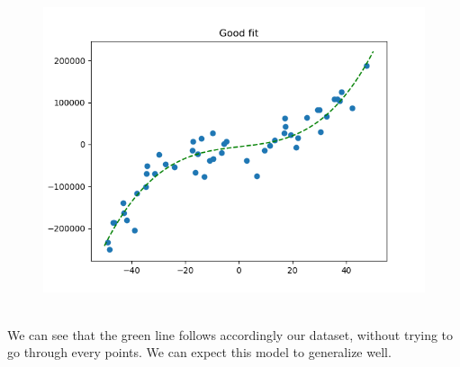 \documentclass[a4paper, 10pt]{article}
\begin{document}
\begin{figure}
\centering
	\includegraphics[scale=0.7]{ex1a_good}
\end{figure}
\\
We can see that the green line follows accordingly our dataset, without trying to go through
every points. We can expect this model to generalize well.
\end{document}
